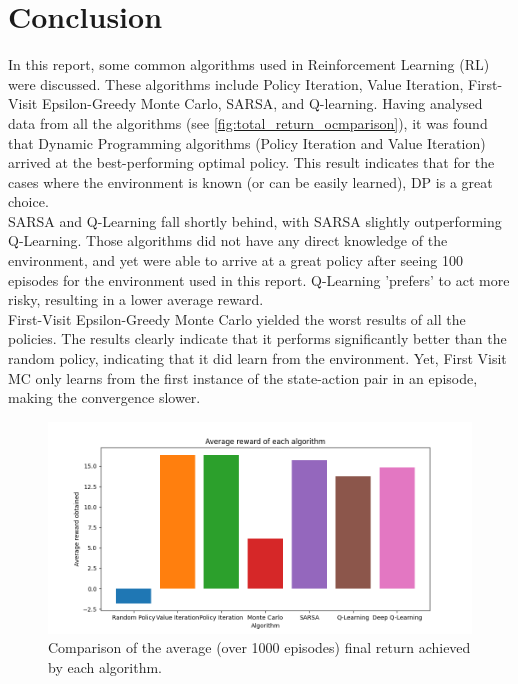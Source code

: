 \documentclass{class}
\begin{document}
\section{Conclusion}
In this report, some common algorithms used in Reinforcement Learning (RL) were discussed. These algorithms include Policy Iteration, Value Iteration, First-Visit Epsilon-Greedy Monte Carlo, SARSA, and Q-learning. Having analysed data from all the algorithms (see \autoref{fig:total_return_ocmparison}), it was found that Dynamic Programming algorithms (Policy Iteration and Value Iteration) arrived at the best-performing optimal policy. This result indicates that for the cases where the environment is known (or can be easily learned), DP is a great choice.
\\[0.3cm]
SARSA and Q-Learning fall shortly behind, with SARSA slightly outperforming Q-Learning. Those algorithms did not have any direct knowledge of the environment, and yet were able to arrive at a great policy after seeing 100 episodes for the environment used in this report. Q-Learning 'prefers' to act more risky, resulting in a lower average reward.
\\[0.3cm]
First-Visit Epsilon-Greedy Monte Carlo yielded the worst results of all the policies. The results clearly indicate that it performs significantly better than the random policy, indicating that it did learn from the environment. Yet, First Visit MC only learns from the first instance of the state-action pair in an episode, making the convergence slower.

\begin{figure}[H]
    \centering
    \includegraphics[width=0.5\linewidth]{plots/comparison/total_return_comparison.png}
    \caption{Comparison of the average (over 1000 episodes) final return achieved by each algorithm.}
    \label{fig:total_return_ocmparison}
\end{figure}


\printbibliography[title={References}]
\end{document}
